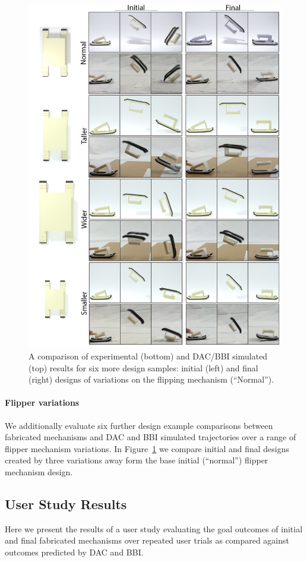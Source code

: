 \begin{figure}[h!]
	\centering
\includegraphics[width=0.7\columnwidth]{./images/ResultsAllFlippers.png}
\caption{A comparison of experimental (bottom) and DAC/BBI simulated (top) results for six more design samples: initial (left) and final (right) designs of variations on the flipping mechanism (``Normal'').}
\label{fig:more_flippers}	
\end{figure}

\paragraph{Flipper variations}
We additionally evaluate six further design example comparisons between fabricated mechanisms and DAC and BBI simulated trajectories over a range of flipper mechanism variations. In Figure~\ref{fig:more_flippers} we compare initial and final designs created by three variations away form the base initial (``normal'') flipper mechanism design.

\subsection{User Study Results}
\label{sec:user}
Here we present the results of a user study evaluating the goal outcomes of initial and final fabricated mechanisms over repeated user trials as compared against outcomes predicted by DAC and BBI.

